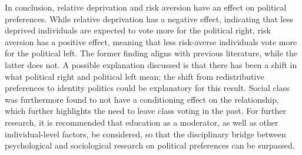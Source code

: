 \documentclass[stu,12pt]{apa7}
\begin{document}
In conclusion, relative deprivation and risk aversion have an effect on political preferences. While relative deprivation has a negative effect, indicating that less deprived individuals are expected to vote more for the political right, risk aversion has a positive effect, meaning that less risk-averse individuals vote more for the political left. The former finding aligns with previous literature, while the latter does not. A possible explanation discussed is that there has been a shift in what political right and political left mean; the shift from redistributive preferences to identity politics could be explanatory for this result. Social class was furthermore found to not have a conditioning effect on the relationship, which further highlights the need to leave class voting in the past. For further research, it is recommended that education as a moderator, as well as other individual-level factors, be considered, so that the disciplinary bridge between psychological and sociological research on political preferences can be surpassed.

\printbibliography
\end{document}
